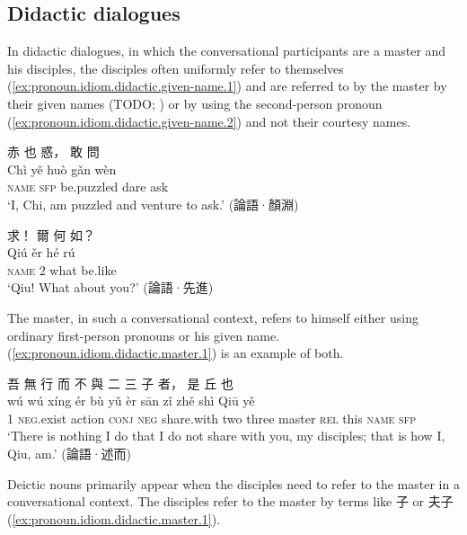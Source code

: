 \documentclass[UTF8, a4paper, oneside, scheme=plain, 12pt]{ctexrep}
\newcommand{\translate}[1]{`#1'}
\newcommand*{\category}[1]{\textsc{#1}}
\begin{document}
\subsection{Didactic dialogues}

In didactic dialogues, in which the conversational participants are a master and his disciples, the disciples often uniformly refer to themselves (\ref{ex:pronoun.idiom.didactic.given-name.1}) and are referred to by the master by their given names (TODO; ) or by using the second-person pronoun (\ref{ex:pronoun.idiom.didactic.given-name.2}) and not their courtesy names.

\begin{exe}
    \ex\label{ex:pronoun.idiom.didactic.given-name.1}
    \glll 赤 也 惑， 敢 問 \\
    Chì yě huò gǎn wèn \\
    \category{name} \category{sfp} be.puzzled dare ask \\
    \glt\translate{I, Chi, am puzzled and venture to ask.} \hfill (論語·顏淵)

    \ex\label{ex:pronoun.idiom.didactic.given-name.2}
    \glll 求！ 爾 何 如？ \\
    Qiú ěr hé rú \\
    \category{name} 2 what be.like \\
    \glt\translate{Qiu! What about you?} \hfill (論語·先進)
\end{exe}

The master, in such a conversational context, 
refers to himself either using ordinary first-person pronouns or his given name.
(\ref{ex:pronoun.idiom.didactic.master.1}) is an example of both.

\begin{exe}
    \ex\label{ex:pronoun.idiom.didactic.master.1}
    \glll 吾 無 行 而 不 與 二 三 子 者， 是 丘 也 \\
    wú wú xíng ér bù yǔ èr sān zǐ zhě shì Qiū yě \\
    1 \category{neg}.exist action \category{conj} \category{neg} share.with two three master \category{rel} this \category{name} \category{sfp} \\
    \glt\translate{There is nothing I do that I do not share with you, my disciples; that is how I, Qiu, am.} \hfill (論語·述而)
\end{exe}

Deictic nouns primarily appear when the disciples need to refer to the master in a conversational context.
The disciples refer to the master by terms like 子 or 夫子 (\ref{ex:pronoun.idiom.didactic.master.1}).
\end{document}
